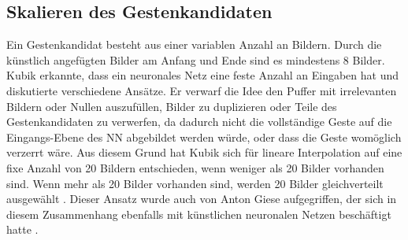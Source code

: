 \subsection{Skalieren des Gestenkandidaten}
\label{sec:scaling}
Ein Gestenkandidat besteht aus einer variablen Anzahl an Bildern. Durch die künstlich angefügten Bilder am Anfang und Ende sind es mindestens 8 Bilder. Kubik erkannte, dass ein neuronales Netz eine feste Anzahl an
Eingaben hat und diskutierte verschiedene Ansätze.
\newline
\newline
Er verwarf die Idee den Puffer mit irrelevanten Bildern oder Nullen auszufüllen, Bilder zu duplizieren oder Teile des Gestenkandidaten zu verwerfen, da dadurch
nicht die vollständige Geste auf die Eingangs-Ebene des NN abgebildet werden würde, oder dass die Geste womöglich verzerrt wäre.
\newline
\newline
Aus diesem Grund hat Kubik sich für lineare Interpolation auf eine fixe Anzahl von 20 Bildern entschieden, wenn weniger als 20 Bilder vorhanden sind. Wenn mehr als 20 Bilder vorhanden sind,
werden 20 Bilder gleichverteilt ausgewählt \cite{kubikThesis}. Dieser Ansatz wurde auch von Anton Giese aufgegriffen, der sich in diesem Zusammenhang ebenfalls mit künstlichen neuronalen Netzen
beschäftigt hatte \cite{gieseThesis}.